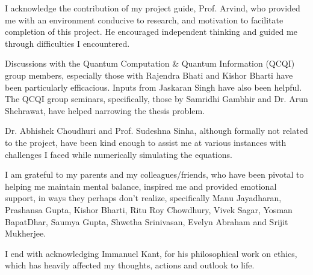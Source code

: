 \begin{acknowledgements}
I acknowledge the contribution of my project guide, Prof. Arvind,
who provided me with an environment conducive to research, and motivation
to facilitate completion of this project. He encouraged independent
thinking and guided me through difficulties I encountered.

Discussions with the Quantum Computation \& Quantum Information (QCQI)
group members, especially those with Rajendra Bhati and Kishor Bharti
have been particularly efficacious. Inputs from Jaskaran Singh have
also been helpful. The QCQI group seminars, specifically, those by
Samridhi Gambhir and Dr. Arun Shehrawat, have helped narrowing the
thesis problem. 

Dr. Abhishek Choudhuri and Prof. Sudeshna Sinha, although formally
not related to the project, have been kind enough to assist me at
various instances with challenges I faced while numerically simulating
the equations. 

I am grateful to my parents and my colleagues/friends, who have been
pivotal to helping me maintain mental balance, inspired me and provided
emotional support, in ways they perhaps don't realize, specifically
Manu Jayadharan, Prashansa Gupta, Kishor Bharti, Ritu Roy Chowdhury,
Vivek Sagar, Yosman BapatDhar, Saumya Gupta, Shwetha Srinivasan, Evelyn
Abraham and Srijit Mukherjee.

I end with acknowledging Immanuel Kant, for his philosophical work
on ethics, which has heavily affected my thoughts, actions and outlook
to life.%
\end{acknowledgements}


